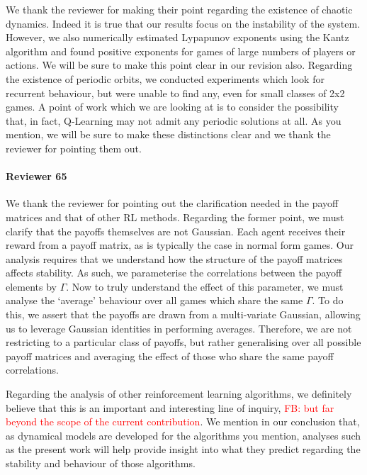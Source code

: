 \documentclass{article}
\newcommand\fb[1]{\textcolor{red}{FB: #1}}
\begin{document}
We thank the reviewer for making their point regarding the existence of chaotic dynamics. Indeed it
is true that our results focus on the instability of the system. However, we also numerically
estimated Lypapunov exponents using the Kantz algorithm and found positive exponents for games of
large numbers of players or actions. We will be sure to make this point clear in our revision also.
Regarding the existence of periodic orbits, we conducted experiments which look for recurrent
behaviour, but were unable to find any, even for small classes of 2x2 games. A point of work which
we are looking at is to consider the possibility that, in fact, Q-Learning may not admit any
periodic solutions at all. As you mention, we will be sure to make these distinctions clear and we
thank the reviewer for pointing them out.


\paragraph{Reviewer 65} %
\label{par:reviewer_65}

We thank the reviewer for pointing out the clarification needed in the payoff matrices and that of
other RL methods. Regarding the former point, we must clarify that the payoffs themselves are not
Gaussian. Each agent receives their reward from a payoff matrix, as is typically the case in normal
form games. Our analysis requires that we understand how the structure of the payoff matrices
affects stability. As such, we parameterise the correlations between the payoff elements by
$\Gamma$. Now to truly understand the effect of this parameter, we must analyse the `average'
behaviour over all games which share the same $\Gamma$. To do this, we assert that the payoffs are
drawn from a multi-variate Gaussian, allowing us to leverage Gaussian identities in performing
averages. Therefore, we are not restricting to a particular class of payoffs, but rather
generalising over all possible payoff matrices and averaging the effect of those who share the same
payoff correlations.

Regarding the analysis of other reinforcement learning algorithms, we definitely believe that this
is an important and interesting line of inquiry, \fb{but far beyond the scope of the current contribution}. We mention in our conclusion that, as
dynamical models are developed for the algorithms you mention, analyses such as the present work
will help provide insight into what they predict regarding the stability and behaviour of those
algorithms.
\end{document}

